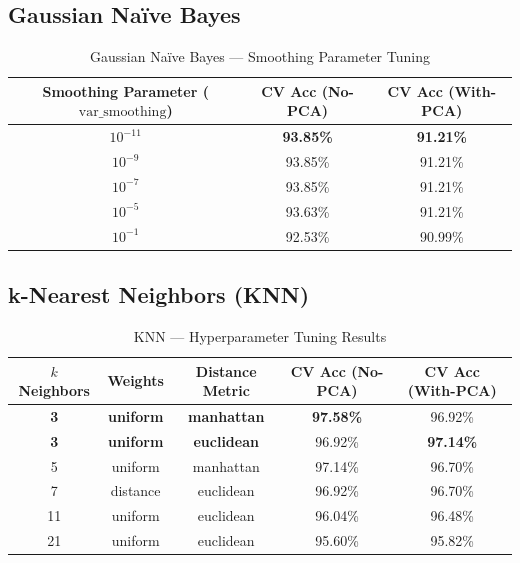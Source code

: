 \documentclass[12pt,a4paper]{article}
\begin{document}
\subsection{Gaussian Naïve Bayes}
\begin{table}[H]
\centering
\caption{Gaussian Naïve Bayes — Smoothing Parameter Tuning}
\begin{tabular}{ccc}
\toprule
\textbf{Smoothing Parameter ($\text{var\_smoothing}$)} & \textbf{CV Acc (No-PCA)} & \textbf{CV Acc (With-PCA)} \\
\midrule
\textbf{$10^{-11}$} & \textbf{93.85\%} & \textbf{91.21\%} \\
$10^{-9}$ & 93.85\% & 91.21\% \\
$10^{-7}$ & 93.85\% & 91.21\% \\
$10^{-5}$ & 93.63\% & 91.21\% \\
$10^{-1}$ & 92.53\% & 90.99\% \\
\bottomrule
\end{tabular}
\end{table}

\subsection{k-Nearest Neighbors (KNN)}
\begin{table}[H]
\centering
\caption{KNN — Hyperparameter Tuning Results}
\begin{tabular}{ccccc}
\toprule
\textbf{$k$ Neighbors} & \textbf{Weights} & \textbf{Distance Metric} & \textbf{CV Acc (No-PCA)} & \textbf{CV Acc (With-PCA)} \\
\midrule
\textbf{3} & \textbf{uniform} & \textbf{manhattan} & \textbf{97.58\%} & 96.92\% \\
\textbf{3} & \textbf{uniform} & \textbf{euclidean} & 96.92\% & \textbf{97.14\%} \\
5 & uniform & manhattan & 97.14\% & 96.70\% \\
7 & distance & euclidean & 96.92\% & 96.70\% \\
11 & uniform & euclidean & 96.04\% & 96.48\% \\
21 & uniform & euclidean & 95.60\% & 95.82\% \\
\bottomrule
\end{tabular}
\end{table}
\end{document}
